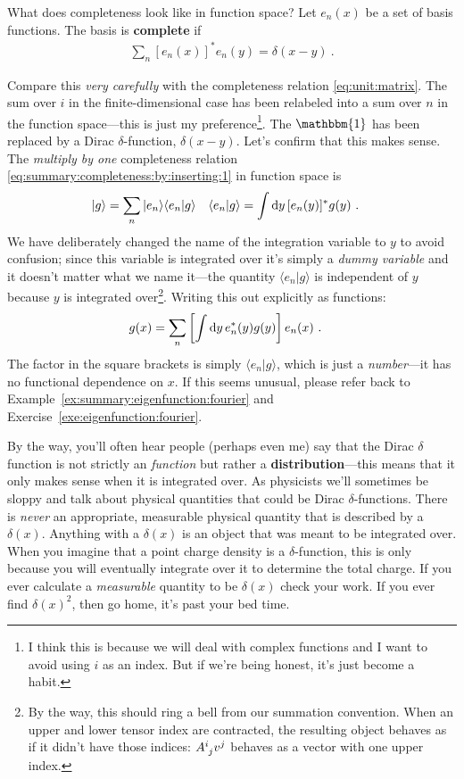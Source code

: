What does completeness look like in function space?
% 
Let $e_{n}(x)$ be a set of basis functions. The basis is \textbf{complete} if
\begin{align}
  \sum_n \left[e_{n}(x)\right]^* e_{n}(y) = \delta(x-y) \ .
  \label{eq:summary:function:space:completeness}
\end{align}


Compare this \emph{very carefully} with the completeness relation \eqref{eq:unit:matrix}. The sum over $i$ in the finite-dimensional case has been relabeled into a sum over $n$ in the function space---this is just my preference\footnote{I think this is because we will deal with complex functions and I want to avoid using $i$ as an index. But if we're being honest, it's just become a habit.}. The $\mathbbm{1}$ has been replaced by a Dirac $\delta$-function, $\delta(x-y)$. Let's confirm that this makes sense. The \emph{multiply by one} completeness relation \eqref{eq:summary:completeness:by:inserting:1} in function space is
\begin{align}
  |g\rangle 
  &= 
  \sum_n |e_{n}\rangle\langle e_{n}| g\rangle
  &
  \langle e_{n}| g\rangle &=
  \int \operatorname{d}\mkern-3mu^{}\mkern-1mu{y} \, [e_{n}(y)]^* g(y) \ .
\end{align}
We have deliberately changed the name of the integration variable to $y$ to avoid confusion; since this variable is integrated over it's simply a \emph{dummy variable} and it doesn't matter what we name it---the quantity $\langle e_{n}|g\rangle$ is independent of $y$ because $y$ is integrated over\footnote{By the way, this should ring a bell from our summation convention. When an upper and lower tensor index are contracted, the resulting object behaves as if it didn't have those indices: $\mat{A}{i}{j}v^j$ behaves as a vector with one upper index.}. Writing this out explicitly as functions:
\begin{align}
  g(x) &= \sum_n\left[\int \D{y}\, e_{n}^*(y)g(y)\right] e_{n}(x) \ .
  \label{eq:summary:complenesss:function:space:in:action}
\end{align}
The factor in the square brackets is simply $\langle e_{n}| g\rangle$, which is just a \emph{number}---it has no functional dependence on $x$.
If this seems unusual, please refer back to Example~\ref{ex:summary:eigenfunction:fourier} and Exercise~\ref{exe:eigenfunction:fourier}. 

By the way, you'll often hear people (perhaps even me) say that the Dirac $\delta$ function is not strictly an \emph{function} but rather a \textbf{distribution}---this means that it only makes sense when it is integrated over. As physicists we'll sometimes be sloppy and talk about physical quantities that could be Dirac $\delta$-functions. There is \emph{never} an appropriate, measurable physical quantity that is described by a $\delta(x)$. Anything with a $\delta(x)$ is an object that was meant to be integrated over. When you imagine that a point charge density is a $\delta$-function, this is only because you will eventually integrate over it to determine the total charge. 
If you ever calculate a \emph{measurable} quantity to be $\delta(x)$ check your work. If you ever find $\delta(x)^2$, then go home, it's past your bed time.

